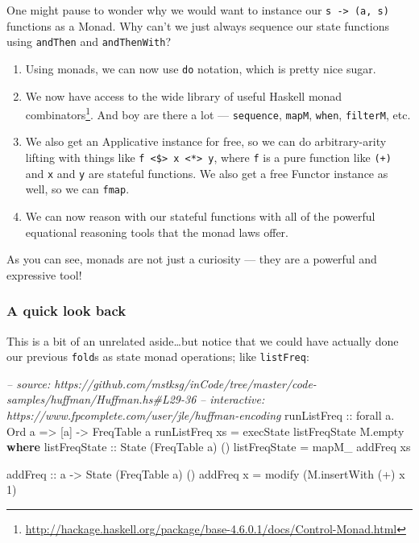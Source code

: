 \documentclass[]{article}
\newenvironment{Shaded}{}{}
\newcommand{\KeywordTok}[1]{\textcolor[rgb]{0.00,0.44,0.13}{\textbf{{#1}}}}
\newcommand{\DataTypeTok}[1]{\textcolor[rgb]{0.56,0.13,0.00}{{#1}}}
\newcommand{\DecValTok}[1]{\textcolor[rgb]{0.25,0.63,0.44}{{#1}}}
\newcommand{\CommentTok}[1]{\textcolor[rgb]{0.38,0.63,0.69}{\textit{{#1}}}}
\newcommand{\OtherTok}[1]{\textcolor[rgb]{0.00,0.44,0.13}{{#1}}}
\newcommand{\FunctionTok}[1]{\textcolor[rgb]{0.02,0.16,0.49}{{#1}}}
\newcommand{\NormalTok}[1]{{#1}}
\renewcommand{\href}[2]{#2\footnote{\url{#1}}}
\begin{document}
One might pause to wonder why we would want to instance our
\texttt{s\ -\textgreater{}\ (a,\ s)} functions as a Monad. Why can't we just
always sequence our state functions using \texttt{andThen} and
\texttt{andThenWith}?

\begin{enumerate}
\def\labelenumi{\arabic{enumi}.}
\item
  Using monads, we can now use \texttt{do} notation, which is pretty nice sugar.
\item
  We now have access to the wide library of useful Haskell
  \href{http://hackage.haskell.org/package/base-4.6.0.1/docs/Control-Monad.html}{monad
  combinators}. And boy are there a lot --- \texttt{sequence}, \texttt{mapM},
  \texttt{when}, \texttt{filterM}, etc.
\item
  We also get an Applicative instance for free, so we can do arbitrary-arity
  lifting with things like
  \texttt{f\ \textless{}\$\textgreater{}\ x\ \textless{}*\textgreater{}\ y},
  where \texttt{f} is a pure function like \texttt{(+)} and \texttt{x} and
  \texttt{y} are stateful functions. We also get a free Functor instance as
  well, so we can \texttt{fmap}.
\item
  We can now reason with our stateful functions with all of the powerful
  equational reasoning tools that the monad laws offer.
\end{enumerate}

As you can see, monads are not just a curiosity --- they are a powerful and
expressive tool!

\subsubsection{A quick look back}\label{a-quick-look-back}

This is a bit of an unrelated aside\ldots{}but notice that we could have
actually done our previous \texttt{fold}s as state monad operations; like
\texttt{listFreq}:

\begin{Shaded}
\begin{Highlighting}[]
\CommentTok{-- source: https://github.com/mstksg/inCode/tree/master/code-samples/huffman/Huffman.hs#L29-36}
\CommentTok{-- interactive: https://www.fpcomplete.com/user/jle/huffman-encoding}
\OtherTok{runListFreq ::} \NormalTok{forall a}\FunctionTok{.} \DataTypeTok{Ord} \NormalTok{a }\OtherTok{=>} \NormalTok{[a] }\OtherTok{->} \DataTypeTok{FreqTable} \NormalTok{a}
\NormalTok{runListFreq xs }\FunctionTok{=} \NormalTok{execState listFreqState M.empty}
  \KeywordTok{where}
\OtherTok{    listFreqState ::} \DataTypeTok{State} \NormalTok{(}\DataTypeTok{FreqTable} \NormalTok{a) ()}
    \NormalTok{listFreqState }\FunctionTok{=} \NormalTok{mapM_ addFreq xs}

\OtherTok{    addFreq ::} \NormalTok{a }\OtherTok{->} \DataTypeTok{State} \NormalTok{(}\DataTypeTok{FreqTable} \NormalTok{a) ()}
    \NormalTok{addFreq x }\FunctionTok{=} \NormalTok{modify (M.insertWith (}\FunctionTok{+}\NormalTok{) x }\DecValTok{1}\NormalTok{)}
\end{Highlighting}
\end{Shaded}
\end{document}
